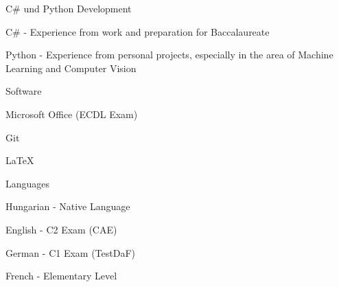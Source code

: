 

\begin{cventries}

  \cventry
    {} %
    {C\# und Python Development} %
    {} %
    {} %
    {
      \begin{cvitems} %
        \item {C\# - Experience from work and preparation for Baccalaureate} 
        \item {Python - Experience from personal projects, especially in the area of Machine Learning and Computer Vision}
      \end{cvitems}
    }

    
    
\cventry
    {} %
    {Software} %
    {} %
    {} %
    {
      \begin{cvitems} %
        \item {Microsoft Office (ECDL Exam)}
        \item {Git}
        \item {\LaTeX}
      \end{cvitems}
    }
    
\cventry
    {} %
    {Languages} %
    {} %
    {} %
    {
      \begin{cvitems} %
        \item {Hungarian - Native Language}
        \item {English - C2 Exam (CAE)}
        \item {German - C1 Exam (TestDaF)}
        \item {French - Elementary Level}
      \end{cvitems}
    }    
\end{cventries}

